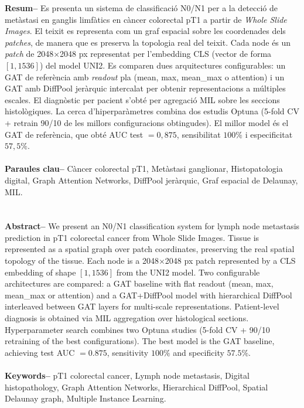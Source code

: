 \documentclass[10pt,a4paper,twocolumn,twoside]{article}
\begin{document}
\begin{@twocolumnfalse}
\begin{center}
\parbox{0.915\textwidth}
{\sffamily
\textbf{Resum--}
Es presenta un sistema de classificació N0/N1 per a la detecció de metàstasi en ganglis limfàtics
en càncer colorectal pT1 a partir de \textit{Whole Slide Images}. El teixit es representa com un
graf espacial sobre les coordenades dels \textit{patches},
de manera que es preserva la topologia real del teixit.
Cada node és un \textit{patch} de 2048$\times$2048 px representat per l'embedding
CLS (vector de forma $[1, 1536]$) del model UNI2. Es comparen dues arquitectures configurables: un GAT de referència
amb \textit{readout} pla (mean, max, mean\_max o attention) i un GAT amb DiffPool jeràrquic
intercalat per obtenir representacions a múltiples escales.
El diagnòstic per pacient s'obté per agregació MIL sobre les seccions histològiques.
La cerca d'hiperparàmetres combina dos estudis Optuna
(5-fold CV + retrain 90/10 de les millors configuracions obtingudes).
El millor model és el GAT de referència, que obté AUC test $=0{,}875$, sensibilitat $100\%$ i
especificitat $57{,}5\%$.
\\
\\
\textbf{Paraules clau-- } Càncer colorectal pT1, Metàstasi ganglionar, Histopatologia digital,
Graph Attention Networks, DiffPool jeràrquic, Graf espacial de Delaunay, MIL.\\
\\
\bigskip
\\
\textbf{Abstract--}
We present an N0/N1 classification system for lymph node metastasis prediction in pT1 colorectal
cancer from Whole Slide Images. Tissue is represented as a spatial graph over patch coordinates,
preserving the real spatial topology of the tissue.
Each node is a 2048$\times$2048 px patch represented by a
CLS embedding of shape $[1, 1536]$ from the UNI2 model. Two configurable architectures are compared: a
GAT baseline with flat readout (mean, max, mean\_max or attention) and a GAT+DiffPool model
with hierarchical DiffPool interleaved between GAT layers for
multi-scale representations. Patient-level diagnosis is obtained via MIL aggregation over
histological sections. Hyperparameter search combines two Optuna studies
(5-fold CV + 90/10 retraining of the best configurations).
The best model is the GAT baseline, achieving test
AUC $=0.875$, sensitivity $100\%$ and specificity $57.5\%$.
\\
\\
\textbf{Keywords-- } pT1 colorectal cancer, Lymph node metastasis, Digital histopathology,
Graph Attention Networks, Hierarchical DiffPool, Spatial Delaunay graph, Multiple Instance Learning.\\
}


\end{center}
\end{@twocolumnfalse}
\end{document}
